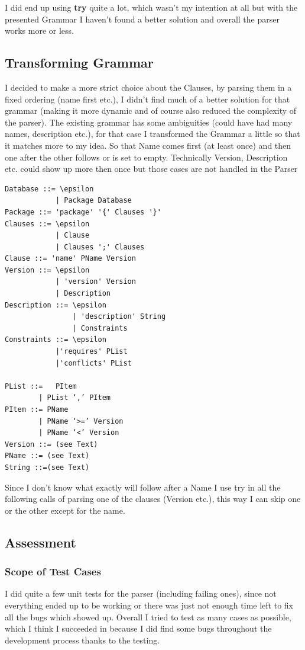 \documentclass[11pt,a4paper]{article}
\begin{document}
I did end up using \textbf{try} quite a lot, which wasn't my intention at all but with the presented Grammar I haven't found a better solution and overall the parser works more or less.

\subsection{Transforming Grammar}
I decided to make a more strict choice about the Clauses, by parsing them in a fixed ordering (name first etc.), I didn't find much of a better solution for that grammar (making it more dynamic and of course also reduced the complexity of the parser).
The existing grammar has some ambiguities (could have had many names, description etc.), for that case I transformed the Grammar a little so that it matches more to my idea.
So that Name comes first (at least once) and then one after the other follows or is set to empty.
Technically Version, Description etc. could show up more then once but those cases are not handled in the Parser
\begin{verbatim}
Database ::= \epsilon
			| Package Database
Package ::= 'package' '{' Clauses '}'
Clauses ::= \epsilon
			| Clause
			| Clauses ';' Clauses
Clause ::= 'name' PName Version
Version ::= \epsilon
			| 'version' Version 
			| Description
Description ::= \epsilon
				| 'description' String 
				| Constraints
Constraints ::= \epsilon	
			|'requires' PList
			|'conflicts' PList									

PList ::= 	PItem
		| PList ‘,’ PItem
PItem ::= PName
		| PName ‘>=’ Version 
		| PName ‘<’ Version
Version ::= (see Text)
PName ::= (see Text)
String ::=(see Text)		
\end{verbatim}

Since I don't know what exactly will follow after a Name I use try in all the following calls of parsing one of the clauses (Version etc.), this way I can skip one or the other except for the name.

\subsection{Assessment}
\subsubsection{Scope of Test Cases}
I did quite a few unit tests for the parser (including failing ones), since not everything ended up to be working or there was just not enough time left to fix all the bugs which showed up.
Overall I tried to test as many cases as possible, which I think I succeeded in because I did find some bugs throughout the development process thanks to the testing.
\end{document}
